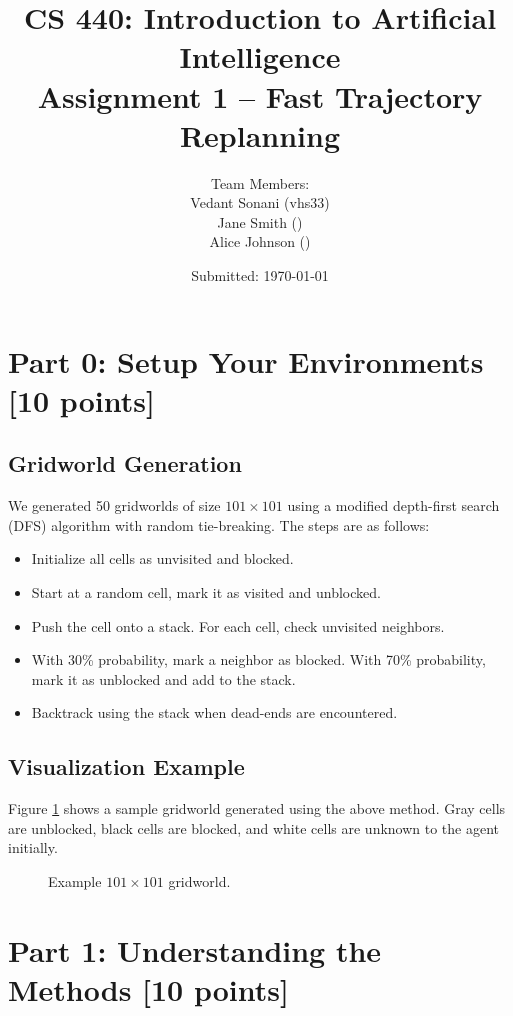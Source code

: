 \documentclass[12pt]{article}
\title{CS 440: Introduction to Artificial Intelligence \\ Assignment 1 -- Fast Trajectory Replanning}
\author{Team Members: \\ 
Vedant Sonani (vhs33) \\ 
Jane Smith (\ruid) \\ 
Alice Johnson (\ruid)}
\date{Submitted: \today}
\begin{document}
\maketitle

\section*{Part 0: Setup Your Environments [10 points]}
\label{sec:part0}

\subsection*{Gridworld Generation}
We generated 50 gridworlds of size \(101 \times 101\) using a modified depth-first search (DFS) algorithm with random tie-breaking. The steps are as follows:
\begin{itemize}
    \item Initialize all cells as unvisited and blocked.
    \item Start at a random cell, mark it as visited and unblocked.
    \item Push the cell onto a stack. For each cell, check unvisited neighbors.
    \item With 30\% probability, mark a neighbor as blocked. With 70\% probability, mark it as unblocked and add to the stack.
    \item Backtrack using the stack when dead-ends are encountered.
\end{itemize}

\subsection*{Visualization Example}
Figure \ref{fig:gridworld} shows a sample gridworld generated using the above method. Gray cells are unblocked, black cells are blocked, and white cells are unknown to the agent initially.

\begin{figure}[ht]
    \centering
    \caption{Example \(101 \times 101\) gridworld.}
    \label{fig:gridworld}
\end{figure}

\section*{Part 1: Understanding the Methods [10 points]}
\label{sec:part1}
\end{document}
